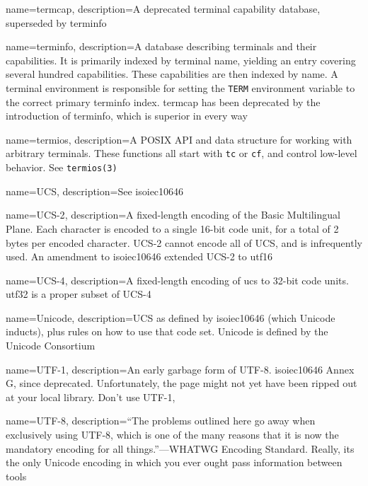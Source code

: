 {
  name={termcap},
description={A deprecated terminal capability database, superseded by \gls{terminfo}}
}

{
  name={terminfo},
description={A database describing terminals and their capabilities. It is
  primarily indexed by terminal name, yielding an entry covering several
  hundred capabilities. These capabilities are then indexed by name. A
  terminal environment is responsible for setting the \texttt{TERM} environment
  variable to the correct primary terminfo index. termcap has been
  deprecated by the introduction of terminfo, which is superior in every way}
}

{
  name={termios},
description={A POSIX API and data structure for working with arbitrary terminals.
  These functions all start with \texttt{tc} or \texttt{cf}, and control
  low-level behavior. See \texttt{termios(3)}\cite{termios}}
}

{
  name={UCS},
  description={See \Gls{isoiec10646}}
}

{
  name={UCS-2},
description={A fixed-length encoding of the Basic Multilingual Plane. Each
  character is encoded to a single 16-bit code unit, for a total of 2 bytes
  per encoded character. UCS-2 cannot encode all of UCS, and is infrequently
  used. An amendment to \Gls{isoiec10646} extended UCS-2 to \Gls{utf16}}
}

{
  name={UCS-4},
description={A fixed-length encoding of \Gls{ucs} to 32-bit code units.
  \Gls{utf32} is a proper subset of UCS-4\cite{rfc3629}}
}

{
  name={Unicode},
description={UCS as defined by \Gls{isoiec10646} (which Unicode inducts), plus
  rules on how to use that code set. Unicode is defined by the Unicode
  Consortium}
}

{
  name={UTF-1},
description={An early garbage form of UTF-8. \Gls{isoiec10646} Annex G, since deprecated.
  Unfortunately, the page might not yet have been ripped out at your local
  library. Don't use UTF-1},
}

{
  name={UTF-8},
description={``The problems outlined here go away when exclusively using UTF-8,
  which is one of the many reasons that it is now the mandatory encoding for
  all things.''---WHATWG Encoding Standard\cite{whatwg}. Really, its the only
  Unicode encoding in which you ever ought pass information between tools\cite{utf8everywhere}}
}

